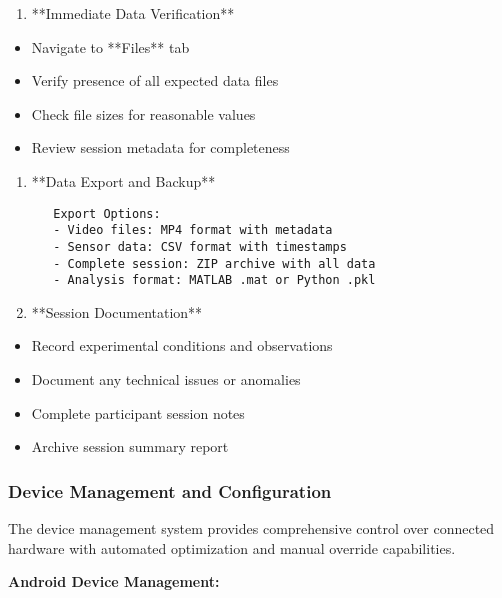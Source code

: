 \documentclass[11pt,a4paper]{article}
\begin{document}
\begin{enumerate}
\item **Immediate Data Verification**
\end{enumerate}
\begin{itemize}
\item Navigate to **Files** tab
\item Verify presence of all expected data files
\item Check file sizes for reasonable values
\item Review session metadata for completeness

\end{itemize}
\begin{enumerate}
\item **Data Export and Backup**
\begin{verbatim}
   Export Options:
   - Video files: MP4 format with metadata
   - Sensor data: CSV format with timestamps
   - Complete session: ZIP archive with all data
   - Analysis format: MATLAB .mat or Python .pkl
\end{verbatim}

\item **Session Documentation**
\end{enumerate}
\begin{itemize}
\item Record experimental conditions and observations
\item Document any technical issues or anomalies
\item Complete participant session notes
\item Archive session summary report

\end{itemize}
\subsubsection{Device Management and Configuration}

The device management system provides comprehensive control over connected hardware with automated optimization and
manual override capabilities.

\textbf{Android Device Management:}
\end{document}
